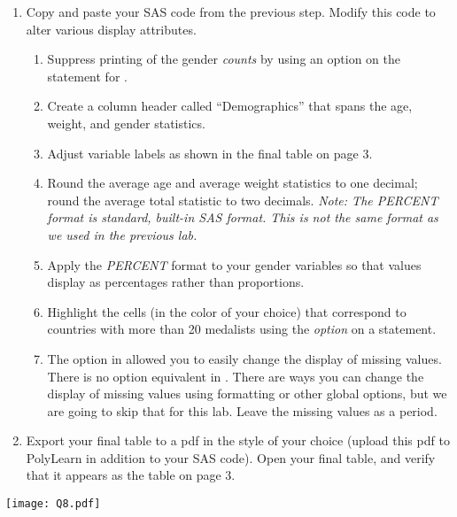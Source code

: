 \begin{enumerate}
\item Copy and paste your SAS code from the previous step.  Modify this code to alter various display attributes.
\begin{enumerate}
\item Suppress printing of the gender \emph{counts} by using an option on the  statement for .
\item Create a column header called ``Demographics'' that spans the age, weight, and gender statistics.
\item Adjust variable labels as shown in the final table on page 3.
\item Round the average age and average weight statistics to one decimal; round the average total statistic to two decimals. \emph{Note: The PERCENT format is standard, built-in SAS format.  This is not the same format as we used in the previous lab.}
\item Apply the \emph{PERCENT} format to your gender variables so that values display as percentages rather than proportions.
\item Highlight the cells (in the color of your choice) that correspond to countries with more than 20 medalists using the  \emph{option} on a  statement.
\item The  option in  allowed you to easily change the display of missing values.  There is no option equivalent in .  There are ways you can change the display of missing values using formatting or other global options, but we are going to skip that for this lab.  Leave the missing values as a period.
\end{enumerate}
\item
Export your final table to a pdf in the style of your choice (upload this pdf to PolyLearn in addition to your SAS code).  Open your final table, and verify that it appears as the table on page 3.
\end{enumerate}
\newpage
\texttt{[image: Q8.pdf]}

 